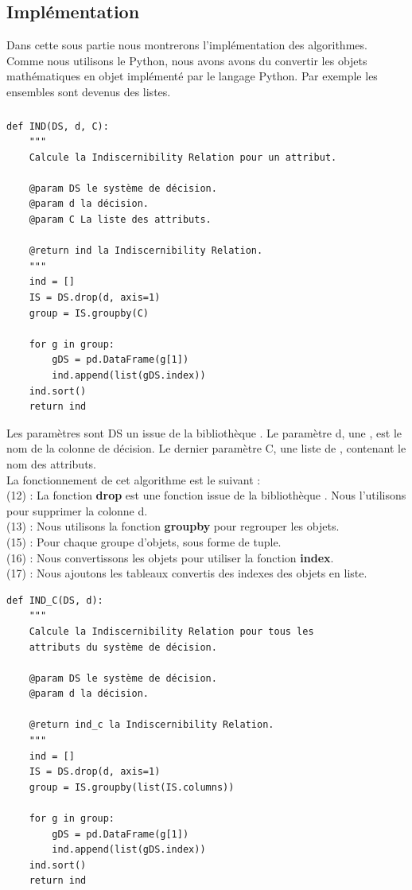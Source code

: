 \subsection{Implémentation}
Dans cette sous partie nous montrerons l'implémentation des algorithmes.
Comme nous utilisons le Python, nous avons avons du convertir les objets
mathématiques en objet implémenté par le langage Python. Par exemple
les ensembles sont devenus des listes. \\
\subsubsection{\ind}
\begin{lstlisting}
def IND(DS, d, C):
	"""
	Calcule la Indiscernibility Relation pour un attribut.
	
	@param DS le système de décision.
	@param d la décision.
	@param C La liste des attributs.
	
	@return ind la Indiscernibility Relation.
	"""
	ind = []
	IS = DS.drop(d, axis=1)
	group = IS.groupby(C)

	for g in group:
		gDS = pd.DataFrame(g[1])
		ind.append(list(gDS.index))
	ind.sort()
	return ind
\end{lstlisting}
Les paramètres sont DS un \df issue de la bibliothèque \panda. Le
paramètre d, une \str, est le nom de la colonne de décision. Le
dernier paramètre C, une liste de \str,  contenant le nom des
attributs. \\
La fonctionnement de cet algorithme est le suivant : \\
(12) :  La fonction \textbf{drop} est une fonction issue de la
bibliothèque \panda. Nous l'utilisons pour supprimer la
colonne d. \\
(13) : Nous utilisons la fonction \textbf{groupby} pour regrouper les
objets. \\
(15) : Pour chaque groupe d'objets, sous forme de tuple. \\
(16) : Nous convertissons les objets pour utiliser la fonction
\textbf{index}. \\
(17) : Nous ajoutons les tableaux convertis des indexes des objets en
liste. \\
\newpage
\begin{lstlisting}
def IND_C(DS, d):
	"""
	Calcule la Indiscernibility Relation pour tous les
	attributs du système de décision.
	
	@param DS le système de décision.
	@param d la décision.
	
	@return ind_c la Indiscernibility Relation.
	"""
	ind = []
	IS = DS.drop(d, axis=1)
	group = IS.groupby(list(IS.columns))

	for g in group:
		gDS = pd.DataFrame(g[1])
		ind.append(list(gDS.index))
	ind.sort()
	return ind
\end{lstlisting}

